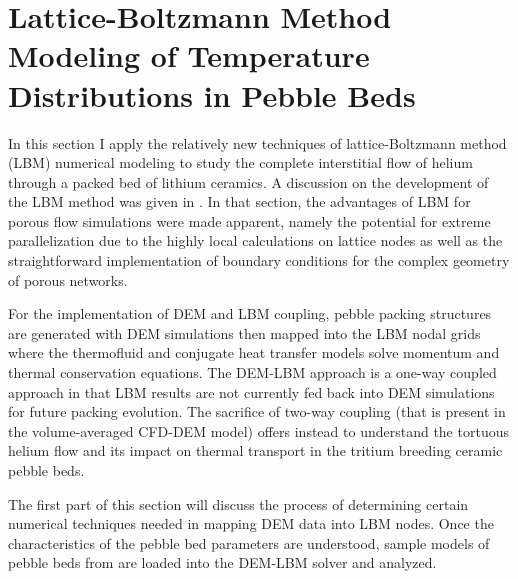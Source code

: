 
\chapter{Lattice-Boltzmann Method Modeling of Temperature Distributions in Pebble Beds}\label{sec:lbm-studies}
In this section I apply the relatively new techniques of lattice-Boltzmann method (LBM) numerical modeling to study the complete interstitial flow of helium through a packed bed of lithium ceramics. A discussion on the development of the LBM method was given in . In that section, the advantages of LBM for porous flow simulations were made apparent, namely the potential for extreme parallelization due to the highly local calculations on lattice nodes as well as the straightforward implementation of boundary conditions for the complex geometry of porous networks.

For the implementation of DEM and LBM coupling, pebble packing structures are generated with DEM simulations then mapped into the LBM nodal grids where the thermofluid and conjugate heat transfer models solve momentum and thermal conservation equations. The DEM-LBM approach is a one-way coupled approach in that LBM results are not currently fed back into DEM simulations for future packing evolution. The sacrifice of two-way coupling (that is present in the volume-averaged CFD-DEM model) offers instead to understand the tortuous helium flow and its impact on thermal transport in the tritium breeding ceramic pebble beds.

The first part of this section will discuss the process of determining certain numerical techniques needed in mapping DEM data into LBM nodes. Once the characteristics of the pebble bed parameters are understood, sample models of pebble beds from  are loaded into the DEM-LBM solver and analyzed.







\FloatBarrier

